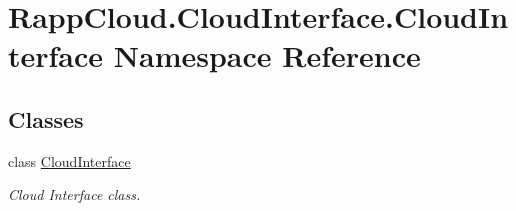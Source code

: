 \hypertarget{namespaceRappCloud_1_1CloudInterface_1_1CloudInterface}{\section{Rapp\-Cloud.\-Cloud\-Interface.\-Cloud\-Interface Namespace Reference}
\label{namespaceRappCloud_1_1CloudInterface_1_1CloudInterface}
}
\subsection*{Classes}
\begin{DoxyCompactItemize}
\item 
class \hyperlink{classRappCloud_1_1CloudInterface_1_1CloudInterface_1_1CloudInterface}{Cloud\-Interface}
\begin{DoxyCompactList}\small\item\em Cloud Interface class. \end{DoxyCompactList}\end{DoxyCompactItemize}
